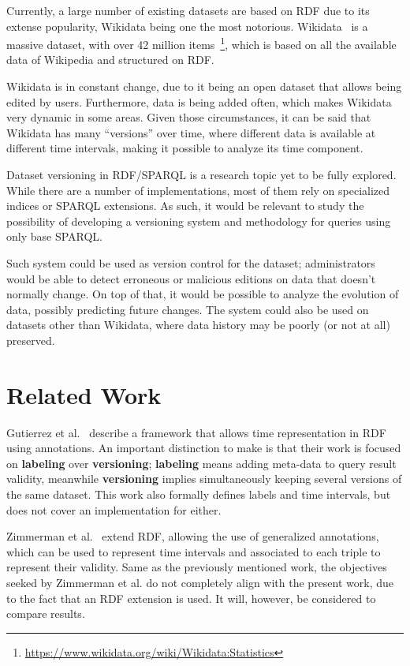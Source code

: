 \documentclass{llncs}
\begin{document}
Currently, a large number of existing datasets are based on RDF due to its extense popularity, Wikidata being one the most notorious. Wikidata~\cite{VrandecicK14} is a massive dataset, with over 42 million items~\footnote{\url{https://www.wikidata.org/wiki/Wikidata:Statistics}}, which is based on all the available data of Wikipedia and structured on RDF.


Wikidata is in constant change, due to it being an open dataset that allows being edited by users. Furthermore, data is being added often, which makes Wikidata very dynamic in some areas. Given those circumstances, it can be said that Wikidata has many ``versions'' over time, where different data is available at different time intervals, making it possible to analyze its time component.


Dataset versioning in RDF/SPARQL is a research topic yet to be fully explored. While there are a number of implementations, most of them rely on specialized indices or SPARQL extensions. As such, it would be relevant to study the possibility of developing a versioning system and methodology for queries using only base SPARQL.


Such system could be used as version control for the dataset; administrators would be able to detect erroneous or malicious editions on data that doesn't normally change. On top of that, it would be possible to analyze the evolution of data, possibly predicting future changes. The system could also be used on datasets other than Wikidata, where data history may be poorly (or not at all) preserved.

\section{Related Work}
Gutierrez et al.~\cite{GutierrezHV07} describe a framework that allows time representation in RDF using annotations. An important distinction to make is that their work is focused on \textbf{labeling} over \textbf{versioning}; \textbf{labeling} means adding meta-data to query result validity, meanwhile \textbf{versioning} implies simultaneously keeping several versions of the same dataset. This work also formally defines labels and time intervals, but does not cover an implementation for either.


Zimmerman et al.~\cite{DBLP:journals/ws/ZimmermannLPS12} extend RDF, allowing the use of generalized annotations, which can be used to represent time intervals and associated to each triple to represent their validity. Same as the previously mentioned work, the objectives seeked by Zimmerman et al. do not completely align with the present work, due to the fact that an RDF extension is used. It will, however, be considered to compare results.
\end{document}
